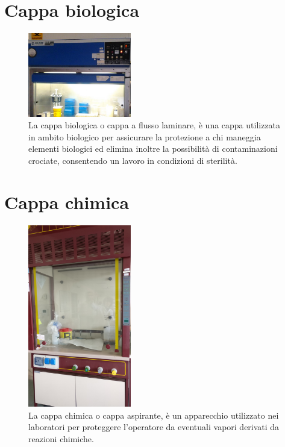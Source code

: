 \documentclass{report}
\begin{document}
	\vspace{0.5cm}


	\section{Cappa biologica}

	\begin{figure}[H]

		\includegraphics[width=0.4\textwidth]{./immagini/cappa_biologica.jpg}
		\caption{La cappa biologica o cappa a flusso laminare, è una cappa utilizzata
		in ambito biologico per assicurare la protezione a chi maneggia elementi
		biologici ed elimina inoltre la possibilità di contaminazioni crociate,
		consentendo un lavoro in condizioni di sterilità.}
		\label{cappa_biologica}

	\end{figure}

	\vspace{0.5cm}


	\section{Cappa chimica}

	\begin{figure}[H]

		\includegraphics[width=0.4\textwidth]{./immagini/cappa_chimica.jpg}
		\caption{La cappa chimica o cappa aspirante, è un apparecchio utilizzato nei
		laboratori per proteggere l'operatore da eventuali vapori derivati da reazioni chimiche.}
		\label{cappa_chimica}

	\end{figure}
\end{document}
